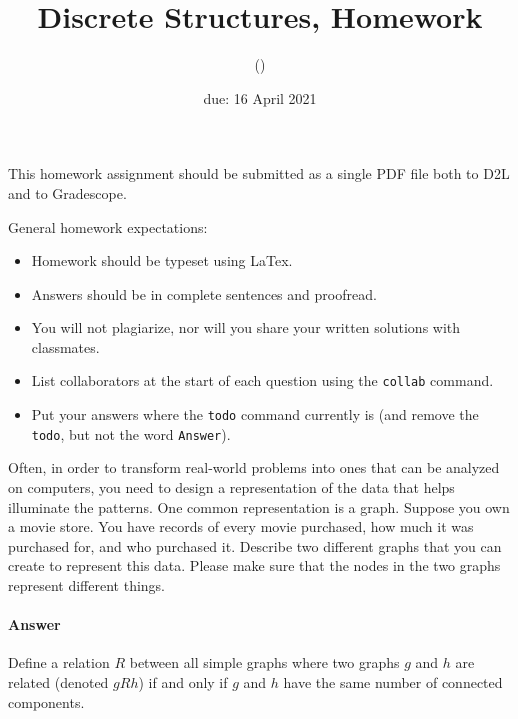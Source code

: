 \documentclass{article}
\title{Discrete Structures, Homework \hwnum}
\author{\todo{Your Name Here} (\todo{your discord handle here})}
\date{due: 16 April 2021}
\begin{document}
\maketitle

This homework assignment should be
submitted as a single PDF file both to D2L and to Gradescope.

General homework expectations:
\begin{itemize}
    \item Homework should be typeset using LaTex.
    \item Answers should be in complete sentences and proofread.
    \item You will not plagiarize, nor will you share your written solutions
        with classmates.
    \item List collaborators at the start of each question using the \texttt{collab} command.
    \item Put your answers where the \texttt{todo} command currently is (and
        remove the \texttt{todo}, but not the word \texttt{Answer}).
\end{itemize}


\collab{\todo{}} 

Often, in order to transform real-world problems into ones that can be analyzed
on computers, you need to design a representation of the data that helps
illuminate the patterns.  One common representation is a graph.  Suppose you own
a movie store.  You have records of every movie purchased, how much it was
purchased for, and who purchased it.  Describe two different graphs that you can
create to represent this data.  Please make sure that the nodes in the two
graphs represent different things.

\paragraph{Answer}



\collab{\todo{}} 

Define a relation $R$ between all simple graphs where two graphs $g$ and $h$ are
related (denoted $gRh$) if and only if $g$ and $h$ have the same number of
connected components.
\end{document}
